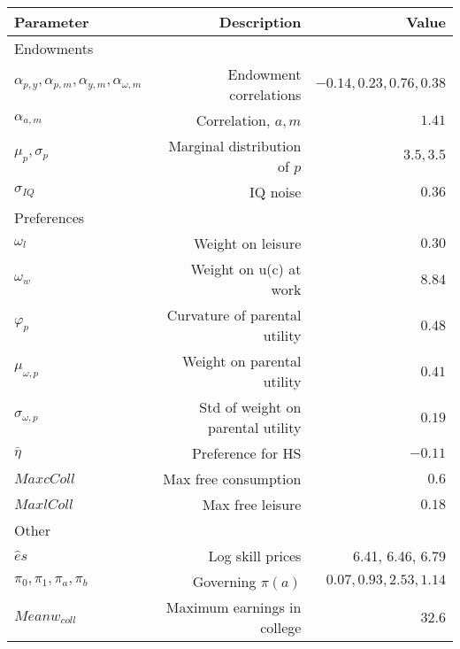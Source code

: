 \begin{tabular}{lrr}
\hline
Parameter & Description  & Value  \\ 
\hline
Endowments &   &   \\ 
$\alpha_{p,y}, \alpha_{p,m}, \alpha_{y,m}, \alpha_{\omega,m}$ & Endowment correlations  & $-0.14, 0.23, 0.76, 0.38$  \\ 
$\alpha_{a,m}$ & Correlation, $a,m$  & $1.41$  \\ 
$\mu_{p}, \sigma_{p}$ & Marginal distribution of $p$  & $3.5, 3.5$  \\ 
$\sigma_{IQ}$ & IQ noise  & $0.36$  \\ 
Preferences &   &   \\ 
$\omega_{l}$ & Weight on leisure  & $0.30$  \\ 
$\omega_{w}$ & Weight on u(c) at work  & $8.84$  \\ 
$\varphi_{p}$ & Curvature of parental utility  & $0.48$  \\ 
$\mu_{\omega,p}$ & Weight on parental utility  & $0.41$  \\ 
$\sigma_{\omega,p}$ & Std of weight on parental utility  & $0.19$  \\ 
$\bar{\eta}$ & Preference for HS  & $-0.11$  \\ 
$Max cColl$ & Max free consumption  & $0.6$  \\ 
$Max lColl$ & Max free leisure  & $0.18$  \\ 
Other &   &   \\ 
$\hat{e}{s}$ & Log skill prices  & 6.41, 6.46, 6.79  \\ 
$\pi_{0}, \pi_{1}, \pi_{a}, \pi_{b}$ & Governing $\pi(a)$  & $0.07, 0.93, 2.53, 1.14$  \\ 
$Mean w_{coll}$ & Maximum earnings in college  & $32.6$  \\ 
\hline
\end{tabular}%
